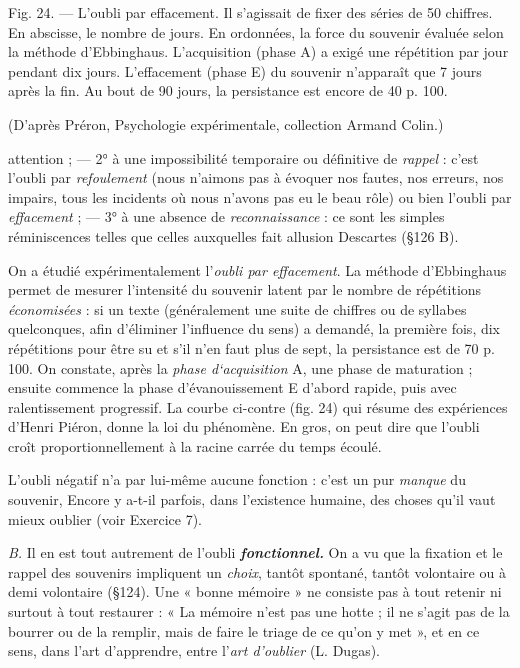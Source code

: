 Fig. 24. — L'oubli par effacement. 
Il s'agissait de fixer des séries de 50 chiffres.
En abscisse, le nombre de jours. En ordonnées, 
la force du souvenir évaluée selon la méthode 
d'Ebbinghaus. L'acquisition (phase A) a
exigé une répétition par jour pendant dix jours. 
L'effacement (phase E) du souvenir n'apparaît 
que 7 jours après la fin. Au bout de 90 jours,
la persistance est encore de 40 p. 100. 

(D'après Préron, Psychologie expérimentale,
collection Armand Colin.)


attention ; — 2° à une impossibilité temporaire ou définitive de {\it rappel} :
c’est l’oubli par {\it refoulement} (nous n’aimons pas à évoquer nos
fautes, nos erreurs, nos impairs, tous les incidents où nous n’avons
pas eu le beau rôle) ou bien l'oubli par {\it effacement} ; — 3° à une absence
de {\it reconnaissance} : ce sont les simples réminiscences telles que celles
auxquelles fait allusion Descartes (\S 126 B).

\vspace{0.24cm}
{\footnotesize 
On a étudié expérimentalement l'{\it oubli par effacement}. La méthode
d'Ebbinghaus permet de mesurer l'intensité du souvenir latent par le
nombre de répétitions {\it économisées} : si un texte (généralement une suite de
chiffres ou de syllabes quelconques, afin d’éliminer l'influence du sens) a
demandé, la première fois, dix répétitions pour être su et s'il n’en faut plus
de sept, la persistance est de 70 p. 100. On constate, après la {\it phase
d‘acquisition} A, une phase de maturation ; ensuite commence la phase
d’évanouissement E d’abord rapide, puis avec ralentissement progressif.
La courbe ci-contre (fig. 24) qui résume des expériences d'Henri Piéron,
donne la loi du phénomène. En gros, on peut dire que l'oubli croît
proportionnellement à la racine carrée du temps écoulé.}
\vspace{0.31cm}

L’oubli négatif n’a par lui-même aucune fonction : c’est un pur
{\it manque} du souvenir, Encore y a-t-il parfois, dans l’existence humaine,
des choses qu’il vaut mieux oublier (voir Exercice 7).

{\it B.} Il en est tout autrement de l’oubli \textbf{\textit {fonctionnel.}} On a vu que la
fixation et le rappel des souvenirs impliquent un {\it choix}, tantôt spontané,
tantôt volontaire ou à demi volontaire (\S 124). Une « bonne
mémoire » ne consiste pas à tout retenir ni surtout à tout restaurer :
« La mémoire n’est pas une hotte ; il ne s’agit pas de la bourrer ou de
la remplir, mais de faire le triage de ce qu’on y met », et en ce sens,
dans l’art d'apprendre, entre l’{\it art d'oublier} (L. Dugas).

